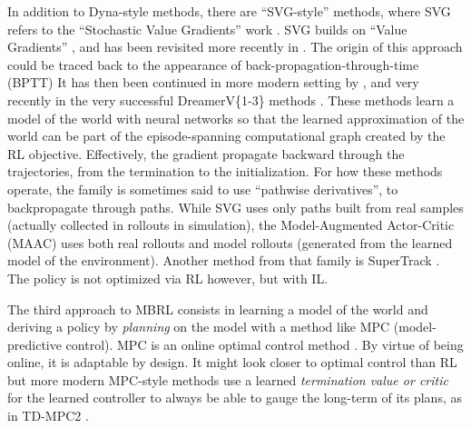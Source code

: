 \documentclass[12pt,a4paper]{article}
\begin{document}
In addition to Dyna-style methods, there are ``SVG-style'' methods, where SVG refers to the
``Stochastic Value Gradients'' work \cite{Heess2015-va}.
SVG builds on ``Value Gradients'' \cite{Fairbank2012-rp},
and has been revisited more recently in \cite{Amos2021-wd}.
The origin of this approach could be traced back to the appearance of
back-propagation-through-time (BPTT)
\cite{Rumelhart1986-ls, Robinson1987-px, Nguyen1990-zx, Werbos1990-qa,
Williams1990-xw, Jordan1992-wn, Grzeszczuk1998-ij}
It has then been continued in more modern setting by \cite{Schmidhuber2011-mt, Deisenroth2011-ya}, 
and very recently in the very successful DreamerV\{1-3\} methods
\cite{Hafner2019-oa, Hafner2021-td, Hafner2023-wk, Lin2023-ql}.
These methods learn a model of the world with neural networks so that the learned approximation of
the world can be part of the episode-spanning computational graph created by the RL objective.
Effectively, the gradient propagate backward through the trajectories, from the termination to
the initialization.
For how these methods operate, the family is sometimes said to use ``pathwise derivatives'',
to backpropagate through paths.
While SVG uses only paths built from real samples (actually collected in rollouts in simulation),
the Model-Augmented Actor-Critic (MAAC) \cite{Clavera2020-ha}
uses both real rollouts and model rollouts (generated from the learned model of the environment).
Another method from that family is SuperTrack \cite{Fussell2021-uf}.
The policy is not optimized via RL however, but with IL.

The third approach to MBRL consists in learning a model of the world and deriving a
policy by \emph{planning} on the model with a method like MPC (model-predictive control).
MPC is an online optimal control method
\cite{Bryson1969-mg, Bertsekas2000-yi, Kirk2004-dq}.
By virtue of being online, it is adaptable by design.
It might look closer to optimal control than RL but more modern
MPC-style methods use a learned \textit{termination value or critic}
for the learned controller to always be able to gauge the long-term of its plans, as in
TD-MPC2 \cite{Hansen2024-ld}.
\end{document}
